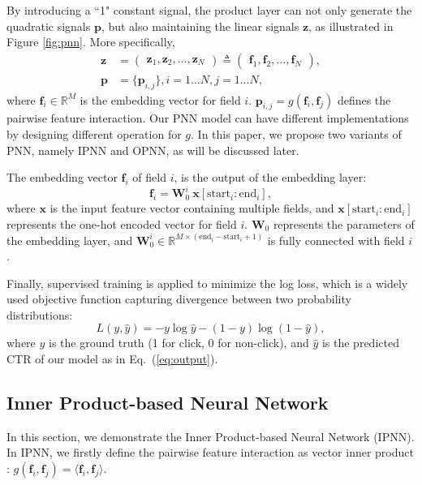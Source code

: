 \documentclass[conference]{IEEEtran}
\newcommand{\bs}{\boldsymbol}
\newcommand{\bW}{\bs{W}}
\newcommand{\bz}{\bs{z}}
\newcommand{\bp}{\bs{p}}
\newcommand{\bx}{\bs{x}}
\newcommand{\Bf}{\bs{f}}
\newcommand{\mR}{\mathbb{R}}
\begin{document}
By introducing a ``1" constant signal, the product layer can not only generate the quadratic signals $\bp$, but also maintaining the linear signals $\bz$, as illustrated in Figure \ref{fig:pnn}. More specifically,
\begin{align}
\bz &= \begin{pmatrix}
\bz_1, \bz_2, \ldots, \bz_N
\end{pmatrix}
\triangleq \begin{pmatrix}
\Bf_1, \Bf_2, \ldots, \Bf_N
\end{pmatrix}, \\
\bp	&=
\{
\bp_{i, j}
\}, i = 1...N, j = 1...N,
\end{align}
where $\Bf_i \in \mathbb{R}^M$ is the embedding vector for field $i$. $\bp_{i, j} = g(\Bf_i, \Bf_j)$ defines the pairwise feature interaction.
Our PNN model can have different implementations by designing different operation for $g$. In this paper, we propose two variants of PNN, namely IPNN and OPNN, as will be discussed later.

The embedding vector $\Bf_i$ of field $i$, is the output of the embedding layer:
\begin{equation}
\Bf_i = \bW_0^i~\bx[\text{start}_i : \text{end}_i],
\end{equation}
where $\bx$ is the input feature vector containing multiple fields, and $\bx[\text{start}_i : \text{end}_i]$ represents the one-hot encoded vector for field $i$. $\bW_0$ represents the parameters of the embedding layer, and $\bW_0^i \in \mR^{M \times (\text{end}_i - \text{start}_i + 1)}$ is fully connected with field $i$.


Finally, supervised training is applied to minimize the log loss, which is a widely used objective function capturing divergence between two probability distributions: \begin{equation}\label{log_loss}
L(y,\hat{y}) = -y \log\hat{y} - (1-y) \log(1-\hat{y}),
\end{equation}
where $y$ is the ground truth (1 for click, 0 for non-click), and $\hat{y}$ is the predicted CTR of our model as in Eq.~(\ref{eq:output}).

\subsection{Inner Product-based Neural Network}\label{sec:pnn-i}
In this section, we demonstrate the Inner Product-based Neural Network (IPNN). In IPNN, we firstly define the pairwise feature interaction as vector inner product
: $g(\Bf_i, \Bf_j) = \langle \Bf_i,\Bf_j \rangle$.
\end{document}
